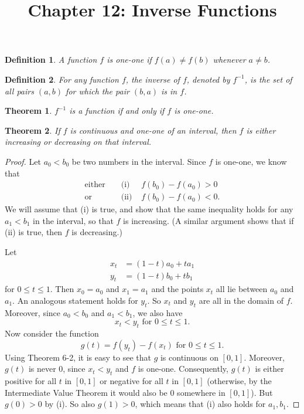 \documentclass{article}
\newtheorem{definition}{Definition}
\newtheorem{theorem}{Theorem}
\begin{document}
\title{Chapter 12: Inverse Functions}
\maketitle

\begin{definition}
  A function $f$ is \emph{one-one} if $f(a) \neq f(b)$ whenever $a \neq b$.
\end{definition}

\begin{definition}
  For any function $f$, the \emph{inverse} of $f$, denoted by $f^{-1}$, is the
  set of all pairs $(a, b)$ for which the pair $(b, a)$ is in $f$.
\end{definition}

\begin{theorem}
  $f^{-1}$ is a function if and only if $f$ is one-one.
\end{theorem}

\begin{theorem}
  If $f$ is continuous and one-one of an interval, then $f$ is either
  increasing or decreasing on that interval.
\end{theorem}
\begin{proof}
  Let $a_0 < b_0$ be two numbers in the interval. Since $f$ is one-one, we know
  that
  \begin{align*}
    \text{either} &&\text{ (i) } &f(b_0) - f(a_0) > 0 \\
    \text{or} &&\text{ (ii) } &f(b_0) - f(a_0) < 0.
  \end{align*}
  We will assume that (i) is true, and show that the same inequality holds for
  any $a_1 < b_1$ in the interval, so that $f$ is increasing. (A similar
  argument shows that if (ii) is true, then $f$ is decreasing.)

  Let
  \begin{align*}
    x_t &= (1 - t)a_0 + ta_1 \\
    y_t &= (1 - t)b_0 + tb_1
  \end{align*}
  for $0 \leq t \leq 1$. Then $x_0 = a_0$ and $x_1 = a_1$ and the points $x_t$
  all lie between $a_0$ and $a_1$. An analogous statement holds for $y_t$. So
  $x_t$ and $y_t$ are all in the domain of $f$. Moreover, since $a_0 < b_0$ and
  $a_1 < b_1$, we also have \[
    x_t < y_t \text{ for } 0 \leq t \leq 1.
  \] Now consider the function \[
    g(t) = f(y_t) - f(x_t) \text{ for } 0 \leq t \leq 1.
  \] Using Theorem 6-2, it is easy to see that $g$ is continuous on $[0, 1]$.
  Moreover, $g(t)$ is never 0, since $x_t < y_t$ and $f$ is one-one.
  Consequently, $g(t)$ is either positive for all $t$ in $[0, 1]$ or negative
  for all $t$ in $[0, 1]$ (otherwise, by the Intermediate Value Theorem it
  would also be 0 somewhere in $[0, 1]$). But $g(0) > 0$ by (i). So also $g(1)
  > 0$, which means that (i) also holds for $a_1, b_1$.
\end{proof}
\end{document}
